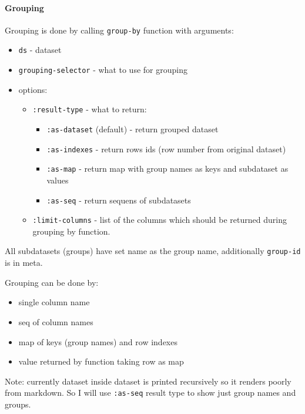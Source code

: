 \documentclass[]{article}
\providecommand{\tightlist}{%
  \setlength{\itemsep}{0pt}\setlength{\parskip}{0pt}}
\let\oldparagraph\paragraph
\renewcommand{\paragraph}[1]{\oldparagraph{#1}\mbox{}}
\begin{document}
\paragraph{Grouping}\label{grouping}

Grouping is done by calling \texttt{group-by} function with arguments:

\begin{itemize}
\tightlist
\item
  \texttt{ds} - dataset
\item
  \texttt{grouping-selector} - what to use for grouping
\item
  options:

  \begin{itemize}
  \tightlist
  \item
    \texttt{:result-type} - what to return:

    \begin{itemize}
    \tightlist
    \item
      \texttt{:as-dataset} (default) - return grouped dataset
    \item
      \texttt{:as-indexes} - return rows ids (row number from original
      dataset)
    \item
      \texttt{:as-map} - return map with group names as keys and
      subdataset as values
    \item
      \texttt{:as-seq} - return sequens of subdatasets
    \end{itemize}
  \item
    \texttt{:limit-columns} - list of the columns which should be
    returned during grouping by function.
  \end{itemize}
\end{itemize}

All subdatasets (groups) have set name as the group name, additionally
\texttt{group-id} is in meta.

Grouping can be done by:

\begin{itemize}
\tightlist
\item
  single column name
\item
  seq of column names
\item
  map of keys (group names) and row indexes
\item
  value returned by function taking row as map
\end{itemize}

Note: currently dataset inside dataset is printed recursively so it
renders poorly from markdown. So I will use \texttt{:as-seq} result type
to show just group names and groups.
\end{document}
